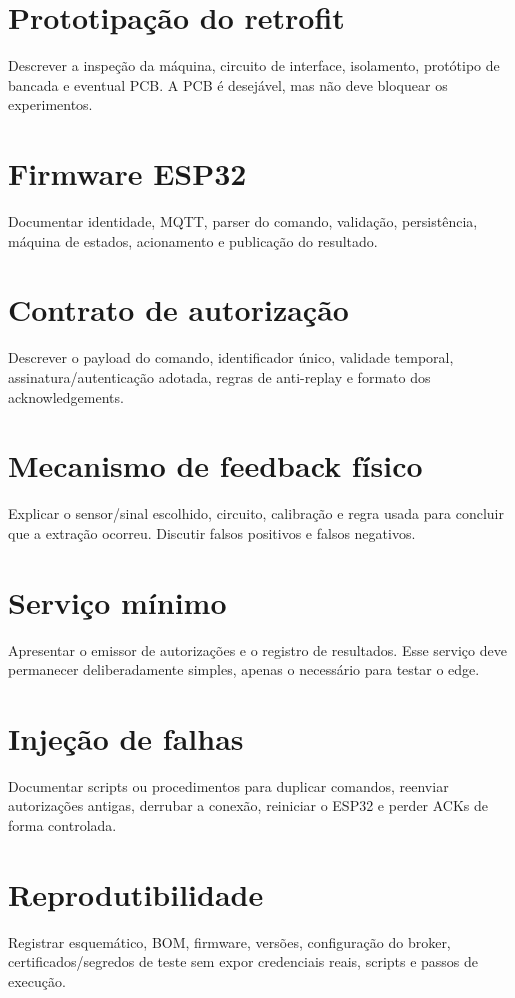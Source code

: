 \section{Prototipação do retrofit}
Descrever a inspeção da máquina, circuito de interface, isolamento, protótipo de bancada e eventual PCB. A PCB é desejável, mas não deve bloquear os experimentos.

\section{Firmware ESP32}
Documentar identidade, MQTT, parser do comando, validação, persistência, máquina de estados, acionamento e publicação do resultado.

\section{Contrato de autorização}
Descrever o payload do comando, identificador único, validade temporal, assinatura/autenticação adotada, regras de anti-replay e formato dos acknowledgements.

\section{Mecanismo de feedback físico}
Explicar o sensor/sinal escolhido, circuito, calibração e regra usada para concluir que a extração ocorreu. Discutir falsos positivos e falsos negativos.

\section{Serviço mínimo}
Apresentar o emissor de autorizações e o registro de resultados. Esse serviço deve permanecer deliberadamente simples, apenas o necessário para testar o edge.

\section{Injeção de falhas}
Documentar scripts ou procedimentos para duplicar comandos, reenviar autorizações antigas, derrubar a conexão, reiniciar o ESP32 e perder ACKs de forma controlada.

\section{Reprodutibilidade}
Registrar esquemático, BOM, firmware, versões, configuração do broker, certificados/segredos de teste sem expor credenciais reais, scripts e passos de execução.
